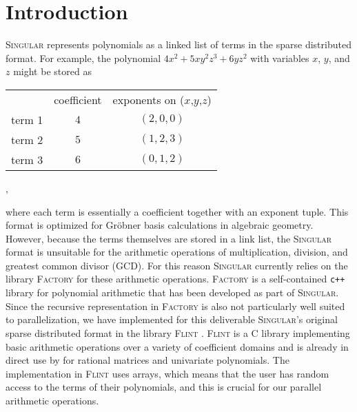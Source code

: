 \documentclass{deliverablereport}
\author{Daniel Schultz}
\begin{document}
\maketitle
\githubissuedescription
\clearpage
\tableofcontents


\section{Introduction}
\textsc{Singular} \cite{DGPS} represents polynomials as a linked list of terms in the sparse distributed format. For example, the polynomial $4 x^2 + 5 x y^2 z^3 + 6 y z^2$ with variables $x$, $y$, and $z$ might be stored as
\begin{center}
\begin{tabular}{ccc}
 & coefficient & exponents on ($x$,$y$,$z$)\\
term 1 & $4$ & $(2,0,0)$\\
term 2 & $5$ & $(1,2,3)$\\
term 3 & $6$ & $(0,1,2)$
\end{tabular},
\end{center}
where each term is essentially a coefficient together with an exponent tuple. This format is optimized for Gr\"obner basis calculations in algebraic geometry. However, because the terms themselves are stored in a link list, the \textsc{Singular} format is unsuitable for the arithmetic operations of multiplication, division, and greatest common divisor (GCD). For this reason \textsc{Singular} currently relies on the library \textsc{Factory} \cite{Factory} for these arithmetic operations. \textsc{Factory} is a self-contained {\tt c++} library for polynomial arithmetic that has been developed as part of \textsc{Singular}. Since the recursive representation in \textsc{Factory} is also not particularly well suited to parallelization, we have implemented for this deliverable \textsc{Singular}'s original sparse distributed format in the library \textsc{Flint} \cite{Hart2010}. \textsc{Flint} is a C library implementing basic arithmetic operations over a variety of coefficient domains and is already in direct use by \Sage for rational matrices and univariate polynomials. The implementation in \textsc{Flint} uses arrays, which means that the user has random access to the terms of their polynomials, and this is crucial for our parallel arithmetic operations.
\end{document}
